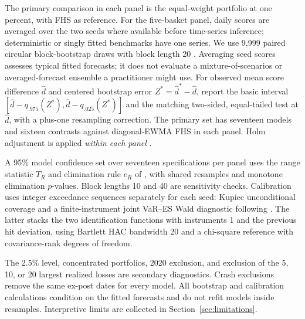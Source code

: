 \documentclass[11pt]{article}
\theoremstyle{definition}\newtheorem{definition}[theorem]{Definition}
\theoremstyle{remark}\newtheorem{remark}[theorem]{Remark}
\begin{document}
The primary comparison in each panel is the equal-weight portfolio at one percent, with FHS as reference. For the five-basket panel, daily scores are averaged over the two seeds where available before time-series inference; deterministic or singly fitted benchmarks have one series. We use 9,999 paired circular block-bootstrap draws with block length 20 \citep{politis1992circular}. Averaging seed scores assesses typical fitted forecasts; it does not evaluate a mixture-of-scenarios or averaged-forecast ensemble a practitioner might use. For observed mean score difference $\widehat d$ and centered bootstrap error $Z^*=\widehat d^*-\widehat d$, report the basic interval
$[\widehat d-q_{.975}(Z^*),\widehat d-q_{.025}(Z^*)]$
and the matching two-sided, equal-tailed test at $\widehat d$, with a plus-one resampling correction. The primary set has seventeen models and sixteen contrasts against diagonal-EWMA FHS in each panel. Holm adjustment is applied \emph{within each panel} \citep{holm1979}. 

A 95\% model confidence set over seventeen specifications per panel uses the range statistic $T_R$ and elimination rule $e_R$ of \citet{hansen2011mcs}, with shared resamples and monotone elimination $p$-values. Block lengths 10 and 40 are sensitivity checks. Calibration uses integer exceedance sequences separately for each seed: Kupiec unconditional coverage \citep{kupiec1995} and a finite-instrument joint VaR--ES Wald diagnostic following \citet{nolde2017}. The latter stacks the two identification functions with instruments 1 and the previous hit deviation, using Bartlett HAC bandwidth 20 and a chi-square reference with covariance-rank degrees of freedom. 

The 2.5\% level, concentrated portfolios, 2020 exclusion, and exclusion of the 5, 10, or 20 largest realized losses are secondary diagnostics. Crash exclusions remove the same ex-post dates for every model. All bootstrap and calibration calculations condition on the fitted forecasts and do not refit models inside resamples. Interpretive limits are collected in Section~\ref{sec:limitations}.
\end{document}
